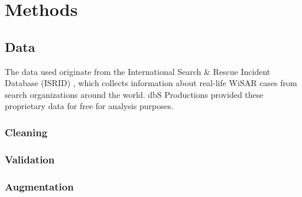 \documentclass[12pt,titlepage]{article}
\begin{document}
  \section{Methods}
    \subsection{Data}
      The data used originate from the International Search \& Rescue Incident
      Database (ISRID) \cite{isrid}, which collects information about real-life
      WiSAR cases from search organizations around the world. dbS Productions
      provided these proprietary data for free for analysis purposes.

      \subsubsection{Cleaning}

      \subsubsection{Validation}

      \subsubsection{Augmentation}



\end{document}
